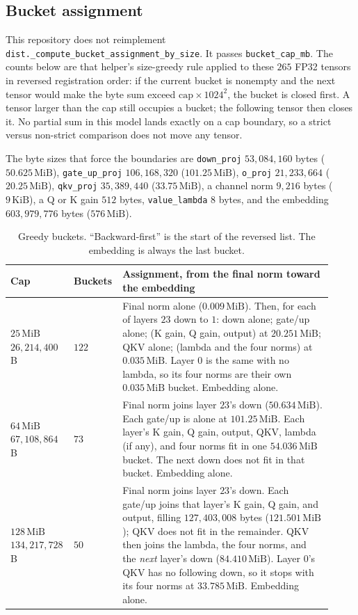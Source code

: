 \documentclass[11pt]{article}
\DeclareRobustCommand{\code}[1]{\texttt{#1}}
\newcommand{\MiB}{\,\mathrm{MiB}}
\begin{document}
\subsection{Bucket assignment}

This repository does not reimplement
\code{dist.\_compute\_bucket\_assignment\_by\_size}. It passes
\code{bucket\_cap\_mb}. The counts below are that helper's size-greedy rule
applied to these \(265\) FP32 tensors in reversed registration order: if the
current bucket is nonempty and the next tensor would make the byte sum
exceed \(\mathrm{cap}\times 1024^{2}\), the bucket is closed first. A tensor
larger than the cap still occupies a bucket; the following tensor then
closes it. No partial sum in this model lands exactly on a cap boundary, so
a strict versus non-strict comparison does not move any tensor.

The byte sizes that force the boundaries are
\code{down\_proj} \(53{,}084{,}160\) bytes (\(50.625\MiB\)),
\code{gate\_up\_proj} \(106{,}168{,}320\) (\(101.25\MiB\)),
\code{o\_proj} \(21{,}233{,}664\) (\(20.25\MiB\)),
\code{qkv\_proj} \(35{,}389{,}440\) (\(33.75\MiB\)),
a channel norm \(9{,}216\) bytes (\(9\,\mathrm{KiB}\)),
a Q or K gain \(512\) bytes,
\code{value\_lambda} \(8\) bytes,
and the embedding \(603{,}979{,}776\) bytes (\(576\MiB\)).

\begin{table}[t]
\centering
\caption{Greedy buckets. ``Backward-first'' is the start of the reversed
list. The embedding is always the last bucket.}
\label{tab:buckets}
\small
\begin{tabular}{@{}L{0.16\linewidth}L{0.12\linewidth}L{0.64\linewidth}@{}}
\toprule
Cap & Buckets & Assignment, from the final norm toward the embedding \\
\midrule
\(25\MiB\) \newline \(26{,}214{,}400\) B
 & \(122\)
 & Final norm alone (\(0.009\MiB\)). Then, for each of layers \(23\) down to \(1\): down alone; gate/up alone; (K gain, Q gain, output) at \(20.251\MiB\); QKV alone; (lambda and the four norms) at \(0.035\MiB\). Layer \(0\) is the same with no lambda, so its four norms are their own \(0.035\MiB\) bucket. Embedding alone. \\
\(64\MiB\) \newline \(67{,}108{,}864\) B
 & \(73\)
 & Final norm joins layer \(23\)'s down (\(50.634\MiB\)). Each gate/up is alone at \(101.25\MiB\). Each layer's K gain, Q gain, output, QKV, lambda (if any), and four norms fit in one \(54.036\MiB\) bucket. The next down does not fit in that bucket. Embedding alone. \\
\(128\MiB\) \newline \(134{,}217{,}728\) B
 & \(50\)
 & Final norm joins layer \(23\)'s down. Each gate/up joins that layer's K gain, Q gain, and output, filling \(127{,}403{,}008\) bytes (\(121.501\MiB\)); QKV does not fit in the remainder. QKV then joins the lambda, the four norms, and the \emph{next} layer's down (\(84.410\MiB\)). Layer \(0\)'s QKV has no following down, so it stops with its four norms at \(33.785\MiB\). Embedding alone. \\
\bottomrule
\end{tabular}
\end{table}
\end{document}
